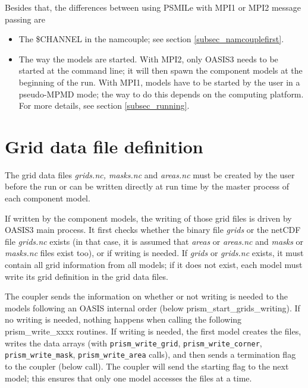 \begin{itemize}
  Besides that, the differences between using PSMILe with MPI1 or MPI2
  message passing are
  \begin{itemize}
  \item The \$CHANNEL in the namcouple; see section
    \ref{subsec_namcouplefirst}.
  \item The way the models are started. With MPI2, only OASIS3 needs
    to be started at the command line; it will then spawn the
    component models at the beginning of the run.  With MPI1, models
    have to be started by the user in a pseudo-MPMD mode; the way to
    do this depends on the computing platform. For more details, see
    section \ref{subsec_running}.
  \end{itemize}
\end{itemize}

\section{Grid data file definition}
\label{subsubsec_griddef}

The grid data files {\em grids.nc, masks.nc} and {\em areas.nc} must
be created by the user before the run or can be written directly
at run time by the master process of each component model. 

If written by the component models, the writing of those grid files is
driven by OASIS3 main process. It first checks whether the binary file
{\em grids} or the netCDF file {\em grids.nc} exists (in that case, it
is assumed that {\em areas} or {\em areas.nc} and {\em masks} or {\em
masks.nc} files exist too), or if writing is needed. If {\em grids} or
{\em grids.nc} exists, it must contain all grid information from all
models; if it does not exist, each model must write its grid
definition in the grid data files.

The coupler sends the information on whether or not writing is needed
to the mo\-dels following an OASIS internal order (below
prism\_start\_grids\_writing). If no writing is needed, nothing
happens when calling the following prism\_write\_xxxx routines. If
writing is needed, the first model creates the files, writes the data
arrays (with {\tt prism\_write\_grid}, {\tt prism\_write\_corner},
{\tt prism\_write\_mask}, {\tt prism\_write\_area} calls),
and then sends a termination flag to the coupler (below  call). The coupler will send the
starting flag to the next model; this ensures that only one model
accesses the files at a time.

